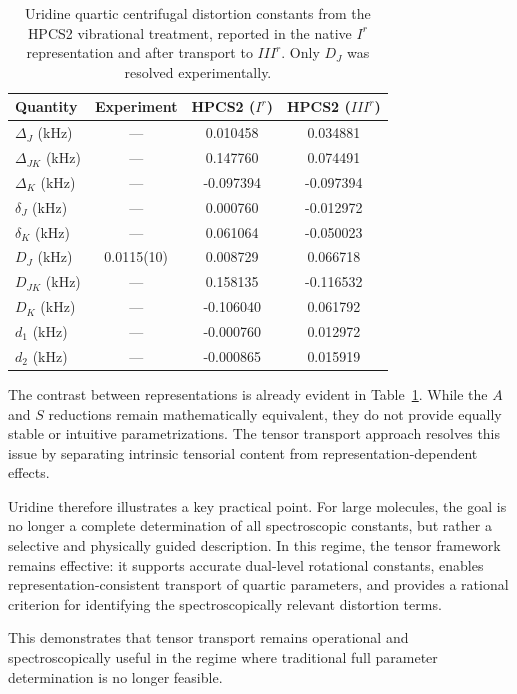 \documentclass[aip,jcp,reprint,floatfix]{revtex4-2}
\begin{document}
\begin{table}[t]
\centering
\scriptsize
\caption{Uridine quartic centrifugal distortion constants from the
HPCS2 vibrational treatment, reported in the native $I^r$
representation and after transport to $III^r$. Only $D_J$ was
resolved experimentally.}

\begin{tabular}{lccc}
\hline
Quantity & Experiment & HPCS2 ($I^r$) & HPCS2 ($III^r$) \\
\hline
$\Delta_J$ (kHz) & --- & 0.010458 & 0.034881 \\
$\Delta_{JK}$ (kHz) & --- & 0.147760 & 0.074491 \\
$\Delta_K$ (kHz) & --- & -0.097394 & -0.097394 \\
$\delta_J$ (kHz) & --- & 0.000760 & -0.012972 \\
$\delta_K$ (kHz) & --- & 0.061064 & -0.050023 \\
\hline
$D_J$ (kHz) & 0.0115(10) & 0.008729 & 0.066718 \\
$D_{JK}$ (kHz) & --- & 0.158135 & -0.116532 \\
$D_K$ (kHz) & --- & -0.106040 & 0.061792 \\
$d_1$ (kHz) & --- & -0.000760 & 0.012972 \\
$d_2$ (kHz) & --- & -0.000865 & 0.015919 \\
\hline
\end{tabular}
\label{tab:uridine_quartic_comparison}
\end{table}

The contrast between representations is already evident in
Table~\ref{tab:uridine_quartic_comparison}. While the $A$ and $S$
reductions remain mathematically equivalent, they do not provide
equally stable or intuitive parametrizations. The tensor transport
approach resolves this issue by separating intrinsic tensorial
content from representation-dependent effects.

Uridine therefore illustrates a key practical point. For large
molecules, the goal is no longer a complete determination of all
spectroscopic constants, but rather a selective and physically guided
description. In this regime, the tensor framework remains effective:
it supports accurate dual-level rotational constants, enables
representation-consistent transport of quartic parameters, and
provides a rational criterion for identifying the spectroscopically
relevant distortion terms.

This demonstrates that tensor transport remains operational and
spectroscopically useful in the regime where traditional full
parameter determination is no longer feasible.
\end{document}
